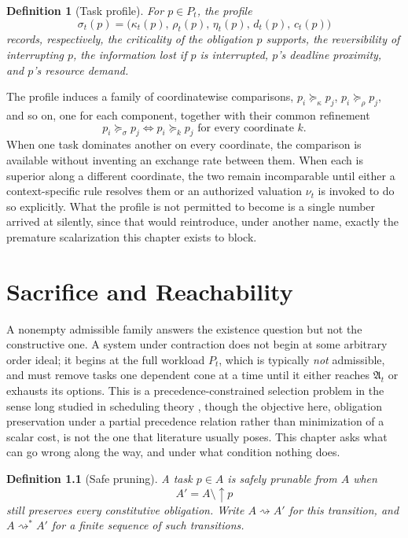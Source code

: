 \documentclass[11pt]{report}
\newtheorem{definition}{Definition}[chapter]
\begin{document}
\begin{definition}[Task profile]
For $p \in P_t$, the profile
\[
\sigma_t(p) = \bigl(\kappa_t(p),\, \rho_t(p),\, \eta_t(p),\, d_t(p),\, c_t(p)\bigr)
\]
records, respectively, the criticality of the obligation $p$ supports, the reversibility of interrupting $p$, the information lost if $p$ is interrupted, $p$'s deadline proximity, and $p$'s resource demand.
\end{definition}

The profile induces a family of coordinatewise comparisons, $p_i \succeq_\kappa p_j$, $p_i \succeq_\rho p_j$, and so on, one for each component, together with their common refinement
\[
p_i \succeq_\sigma p_j \iff p_i \succeq_k p_j \text{ for every coordinate } k.
\]
When one task dominates another on every coordinate, the comparison is available without inventing an exchange rate between them. When each is superior along a different coordinate, the two remain incomparable until either a context-specific rule resolves them or an authorized valuation $\nu_t$ is invoked to do so explicitly. What the profile is not permitted to become is a single number arrived at silently, since that would reintroduce, under another name, exactly the premature scalarization this chapter exists to block.

\chapter{Sacrifice and Reachability}

A nonempty admissible family answers the existence question but not the constructive one. A system under contraction does not begin at some arbitrary order ideal; it begins at the full workload $P_t$, which is typically \emph{not} admissible, and must remove tasks one dependent cone at a time until it either reaches $\mathfrak A_t$ or exhausts its options. This is a precedence-constrained selection problem in the sense long studied in scheduling theory \cite{lawler1978}, though the objective here, obligation preservation under a partial precedence relation rather than minimization of a scalar cost, is not the one that literature usually poses. This chapter asks what can go wrong along the way, and under what condition nothing does.

\begin{definition}[Safe pruning]
A task $p \in A$ is safely prunable from $A$ when
\[
A' = A \setminus \uparrow p
\]
still preserves every constitutive obligation. Write $A \rightsquigarrow A'$ for this transition, and $A \rightsquigarrow^\ast A'$ for a finite sequence of such transitions.
\end{definition}
\end{document}
